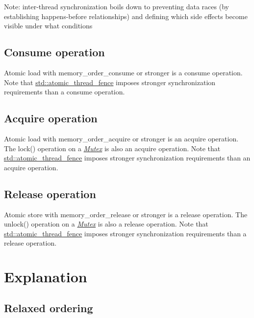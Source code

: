 \documentclass[
]{article}
\begin{document}
Note: inter-thread synchronization boils down to preventing data races
(by establishing happens-before relationships) and defining which side
effects become visible under what conditions

\hypertarget{consume-operation}{%
\subsection{Consume operation}\label{consume-operation}}

Atomic load with memory\_order\_consume or stronger is a consume
operation. Note that
\href{https://en.cppreference.com/w/cpp/atomic/atomic_thread_fence}{std::atomic\_thread\_fence}
imposes stronger synchronization requirements than a consume operation.

\hypertarget{acquire-operation}{%
\subsection{Acquire operation}\label{acquire-operation}}

Atomic load with memory\_order\_acquire or stronger is an acquire
operation. The lock() operation on a
\href{https://en.cppreference.com/w/cpp/named_req/Mutex}{\emph{Mutex}}
is also an acquire operation. Note that
\href{https://en.cppreference.com/w/cpp/atomic/atomic_thread_fence}{std::atomic\_thread\_fence}
imposes stronger synchronization requirements than an acquire operation.

\hypertarget{release-operation}{%
\subsection{Release operation}\label{release-operation}}

Atomic store with memory\_order\_release or stronger is a release
operation. The unlock() operation on a
\href{https://en.cppreference.com/w/cpp/named_req/Mutex}{\emph{Mutex}}
is also a release operation. Note that
\href{https://en.cppreference.com/w/cpp/atomic/atomic_thread_fence}{std::atomic\_thread\_fence}
imposes stronger synchronization requirements than a release operation.

\hypertarget{explanation}{%
\section{Explanation}\label{explanation}}

\hypertarget{relaxed-ordering}{%
\subsection{Relaxed ordering}\label{relaxed-ordering}}
\end{document}
